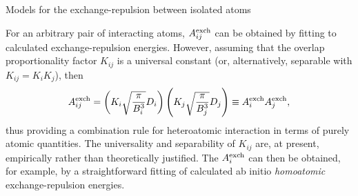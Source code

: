 \begin{subsection}{Models for the exchange-repulsion between isolated atoms}

For an arbitrary pair of interacting atoms, $A^{\text{exch}}_{ij}$ can be obtained by
fitting to calculated exchange-repulsion energies. However, assuming that the
overlap proportionality factor $K_{ij}$ is a universal
constant (or, alternatively, separable 
with $K_{ij} = K_iK_j$), then 
\begin{align}
\label{eq:isotropic-isaff_aij}
A^{\text{exch}}_{ij} = \left(K_i\sqrt{\frac{\pi}{B_i^3}}D_i\right)
\left(K_j\sqrt{\frac{\pi} {B_j^3}} D_j\right) \equiv A^{\text{exch}}_{i}A^{\text{exch}}_{j},
\end{align}
%
thus providing a combination rule for heteroatomic interaction in
terms of purely atomic quantities. The universality and separability
of $K_{ij}$ are, at present, empirically rather than theoretically justified.
\cite{Day2003,Stone2007,Nobeli1998}
The $A^{\text{exch}}_{i}$ can then be obtained, for
example, by a straightforward fitting of calculated ab initio
\emph{homoatomic} exchange-repulsion energies.

\end{subsection}
